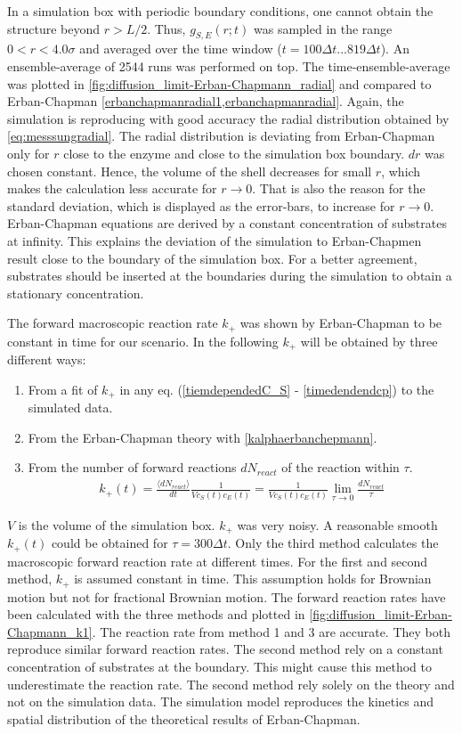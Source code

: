 \documentclass[
  a4paper,BCOR10mm,oneside,
  headsepline,footsepline,%
  fleqn,openbib
]{scrbook}
\begin{document}
In a simulation box with periodic boundary conditions, one cannot obtain the structure beyond $r>L/2$. Thus, $g_{S,E}(r;t)$ was sampled in the range $0 <r<4.0 \sigma$ and averaged over the time window ($t=100 \Delta t ...819 \Delta t$). An ensemble-average of 2544 runs was performed on top. The time-ensemble-average was plotted in \cref{fig:diffusion_limit-Erban-Chapmann_radial} and compared to Erban-Chapman \cref{erbanchapmanradial1,erbanchapmanradial}. Again, the simulation is reproducing with good accuracy the radial distribution obtained by \cref{eq:messsungradial}. The radial distribution is deviating from Erban-Chapman only for $r$ close to the enzyme and close to the simulation box boundary. $dr$ was chosen constant. Hence, the volume of the shell decreases for small $r$, which makes the calculation less accurate for $r\rightarrow 0$. That is also the reason for the standard deviation, which is displayed as the error-bars, to increase for $r\rightarrow 0$.  Erban-Chapman equations are derived by a constant concentration of substrates at infinity. This explains the deviation of the simulation to Erban-Chapmen result close to the boundary of the simulation box. For a better agreement, substrates should be inserted at the boundaries during the simulation to obtain a stationary concentration. 
\par 
The forward macroscopic reaction rate $k_+$ was shown by Erban-Chapman to be constant in time for our scenario. In the following $k_+$ will be obtained by three different ways:
\begin{enumerate}
 \item From a fit of $k_+$ in any eq. (\ref{tiemdependedC_S} - \ref{timedendendcp}) to the simulated data.
 \item From the Erban-Chapman theory with \cref{kalphaerbanchepmann}.
 \item From the number of forward reactions $dN_{react}$ of the reaction  within $\tau$.  
 \begin{align} \label{reactioncount}
  k_+(t)=\frac{ \langle dN_{react}\rangle}{dt}\frac{1}{V c_S(t) c_E(t)}= \frac{1}{V c_S(t) c_E(t)} \lim_{\tau \to 0} \frac{dN_{react}}{\tau}
 \end{align}
\end{enumerate}
$V$ is the volume of the simulation box. $k_+$ was very noisy. A reasonable smooth $k_+(t)$ could be obtained for $\tau=300 \Delta t$. Only the third method calculates the macroscopic forward reaction rate at different times. For the first and second method, $k_{+}$ is assumed constant in time. This assumption holds for Brownian motion but not for fractional Brownian motion. The forward reaction rates have been calculated with the three methods and plotted in \cref{fig:diffusion_limit-Erban-Chapmann_k1}. The reaction rate from method 1 and 3 are accurate. They both reproduce similar forward reaction rates. The second method rely on a constant concentration of substrates at the boundary. This might cause this method to underestimate the reaction rate. The second method rely solely on the theory and not on the simulation data. The simulation model reproduces the kinetics and spatial distribution of the theoretical results of Erban-Chapman.
\end{document}
